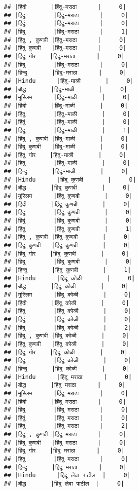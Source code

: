 \documentclass[
]{article}
\begin{document}
\begin{verbatim}
## |हिंदी       |हिंदू-मराठा      |     0|
## |हिंदु        |हिंदू-मराठा      |     0|
## |हिंदुं        |हिंदू-मराठा      |     0|
## |हिंदू        |हिंदू-मराठा      |     1|
## |हिंदू , कुणबी |हिंदू-मराठा      |     0|
## |हिंदू कुणबी   |हिंदू-मराठा      |     0|
## |हिंदू गोर    |हिंदू-मराठा      |     0|
## |हिदू        |हिंदू-मराठा      |     0|
## |हिन्दु       |हिंदू-मराठा      |     0|
## |Hindu      |हिंदू-माळी       |     0|
## |बौद्ध       |हिंदू-माळी       |     0|
## |मुस्लिम      |हिंदू-माळी       |     0|
## |हिंदी       |हिंदू-माळी       |     0|
## |हिंदु        |हिंदू-माळी       |     0|
## |हिंदुं        |हिंदू-माळी       |     0|
## |हिंदू        |हिंदू-माळी       |     1|
## |हिंदू , कुणबी |हिंदू-माळी       |     0|
## |हिंदू कुणबी   |हिंदू-माळी       |     0|
## |हिंदू गोर    |हिंदू-माळी       |     0|
## |हिदू        |हिंदू-माळी       |     0|
## |हिन्दु       |हिंदू-माळी       |     0|
## |Hindu      |हिंदू कुणबी       |     0|
## |बौद्ध       |हिंदू कुणबी       |     0|
## |मुस्लिम      |हिंदू कुणबी       |     0|
## |हिंदी       |हिंदू कुणबी       |     0|
## |हिंदु        |हिंदू कुणबी       |     0|
## |हिंदुं        |हिंदू कुणबी       |     0|
## |हिंदू        |हिंदू कुणबी       |     1|
## |हिंदू , कुणबी |हिंदू कुणबी       |     0|
## |हिंदू कुणबी   |हिंदू कुणबी       |     0|
## |हिंदू गोर    |हिंदू कुणबी       |     0|
## |हिदू        |हिंदू कुणबी       |     0|
## |हिन्दु       |हिंदू कुणबी       |     1|
## |Hindu      |हिंदू कोळी       |     0|
## |बौद्ध       |हिंदू कोळी       |     0|
## |मुस्लिम      |हिंदू कोळी       |     0|
## |हिंदी       |हिंदू कोळी       |     0|
## |हिंदु        |हिंदू कोळी       |     0|
## |हिंदुं        |हिंदू कोळी       |     0|
## |हिंदू        |हिंदू कोळी       |     2|
## |हिंदू , कुणबी |हिंदू कोळी       |     0|
## |हिंदू कुणबी   |हिंदू कोळी       |     0|
## |हिंदू गोर    |हिंदू कोळी       |     0|
## |हिदू        |हिंदू कोळी       |     0|
## |हिन्दु       |हिंदू कोळी       |     0|
## |Hindu      |हिंदू मराठा      |     0|
## |बौद्ध       |हिंदू मराठा      |     0|
## |मुस्लिम      |हिंदू मराठा      |     0|
## |हिंदी       |हिंदू मराठा      |     0|
## |हिंदु        |हिंदू मराठा      |     0|
## |हिंदुं        |हिंदू मराठा      |     0|
## |हिंदू        |हिंदू मराठा      |     2|
## |हिंदू , कुणबी |हिंदू मराठा      |     0|
## |हिंदू कुणबी   |हिंदू मराठा      |     0|
## |हिंदू गोर    |हिंदू मराठा      |     0|
## |हिदू        |हिंदू मराठा      |     0|
## |हिन्दु       |हिंदू मराठा      |     0|
## |Hindu      |हिंदू लेवा पाटील  |     0|
## |बौद्ध       |हिंदू लेवा पाटील  |     0|

\end{verbatim}
\end{document}
